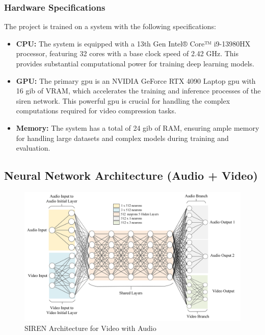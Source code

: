 \documentclass{ioereport}
\begin{document}
\subsubsection{Hardware Specifications}
The project is trained on a system with the following specifications:
    \begin{itemize}
        \item \textbf{CPU:} The system is equipped with a 13th Gen Intel® Core™ i9-13980HX processor, featuring 32 cores with a base clock speed of 2.42 GHz. This provides substantial computational power for training deep learning models.
        \item \textbf{GPU:} The primary \gls{gpu} is an NVIDIA GeForce RTX 4090 Laptop \gls{gpu} with 16 \gls{gib} of VRAM, which accelerates the training and inference processes of the \gls{siren} network. This powerful \gls{gpu} is crucial for handling the complex computations required for video compression tasks.
        \item \textbf{Memory:} The system has a total of 24 \gls{gib} of RAM, ensuring ample memory for handling large datasets and complex models during training and evaluation.
    \end{itemize}




\subsection{Neural Network Architecture (Audio + Video)}
\begin{figure}[H]
    \centering
    \includegraphics[width=\linewidth]{assets/audio_video_neural.png}
    \caption{SIREN Architecture for Video with Audio}
    \label{fig:arch-audio}
\end{figure}
\end{document}
